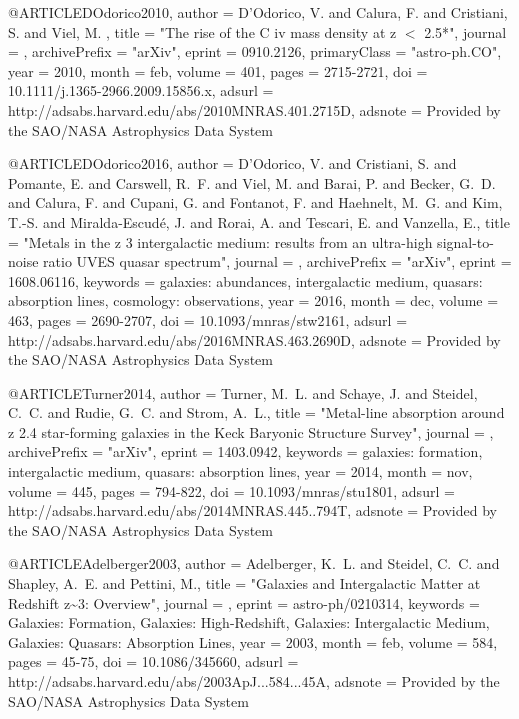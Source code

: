 \documentclass{aa}
\begin{document}
{{{{{{{{{{{{{{@ARTICLE{DOdorico2010,
   author = {{D'Odorico}, V. and {Calura}, F. and {Cristiani}, S. and {Viel}, M.
	},
    title = "{The rise of the C iv mass density at z $\lt$ 2.5*}",
  journal = {\mnras},
archivePrefix = "arXiv",
   eprint = {0910.2126},
 primaryClass = "astro-ph.CO",
     year = 2010,
    month = feb,
   volume = 401,
    pages = {2715-2721},
      doi = {10.1111/j.1365-2966.2009.15856.x},
   adsurl = {http://adsabs.harvard.edu/abs/2010MNRAS.401.2715D},
  adsnote = {Provided by the SAO/NASA Astrophysics Data System}
}

@ARTICLE{DOdorico2016,
   author = {{D'Odorico}, V. and {Cristiani}, S. and {Pomante}, E. and {Carswell}, R.~F. and 
	{Viel}, M. and {Barai}, P. and {Becker}, G.~D. and {Calura}, F. and 
	{Cupani}, G. and {Fontanot}, F. and {Haehnelt}, M.~G. and {Kim}, T.-S. and 
	{Miralda-Escud{\'e}}, J. and {Rorai}, A. and {Tescari}, E. and 
	{Vanzella}, E.},
    title = "{Metals in the z {\tilde} 3 intergalactic medium: results from an ultra-high signal-to-noise ratio UVES quasar spectrum}",
  journal = {\mnras},
archivePrefix = "arXiv",
   eprint = {1608.06116},
 keywords = {galaxies: abundances, intergalactic medium, quasars: absorption lines, cosmology: observations},
     year = 2016,
    month = dec,
   volume = 463,
    pages = {2690-2707},
      doi = {10.1093/mnras/stw2161},
   adsurl = {http://adsabs.harvard.edu/abs/2016MNRAS.463.2690D},
  adsnote = {Provided by the SAO/NASA Astrophysics Data System}
}

@ARTICLE{Turner2014,
   author = {{Turner}, M.~L. and {Schaye}, J. and {Steidel}, C.~C. and {Rudie}, G.~C. and 
	{Strom}, A.~L.},
    title = "{Metal-line absorption around z {\ap} 2.4 star-forming galaxies in the Keck Baryonic Structure Survey}",
  journal = {\mnras},
archivePrefix = "arXiv",
   eprint = {1403.0942},
 keywords = {galaxies: formation, intergalactic medium, quasars: absorption lines},
     year = 2014,
    month = nov,
   volume = 445,
    pages = {794-822},
      doi = {10.1093/mnras/stu1801},
   adsurl = {http://adsabs.harvard.edu/abs/2014MNRAS.445..794T},
  adsnote = {Provided by the SAO/NASA Astrophysics Data System}
}

@ARTICLE{Adelberger2003,
   author = {{Adelberger}, K.~L. and {Steidel}, C.~C. and {Shapley}, A.~E. and 
	{Pettini}, M.},
    title = "{Galaxies and Intergalactic Matter at Redshift z\~{}3: Overview}",
  journal = {\apj},
   eprint = {astro-ph/0210314},
 keywords = {Galaxies: Formation, Galaxies: High-Redshift, Galaxies: Intergalactic Medium, Galaxies: Quasars: Absorption Lines},
     year = 2003,
    month = feb,
   volume = 584,
    pages = {45-75},
      doi = {10.1086/345660},
   adsurl = {http://adsabs.harvard.edu/abs/2003ApJ...584...45A},
  adsnote = {Provided by the SAO/NASA Astrophysics Data System}
}

}}}}}}}}}}}}}}
\end{document}

